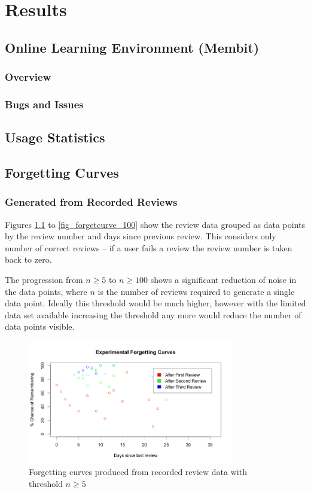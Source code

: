 \chapter{Results}

\section{Online Learning Environment (Membit)}
\subsection{Overview}
\subsection{Bugs and Issues}

\section{Usage Statistics}

\section{Forgetting Curves}
\subsection*{Generated from Recorded Reviews}

Figures \ref{fig_forgetcurve_5} to \ref{fig_forgetcurve_100} show the review data grouped
as data points by the review number and days since previous review. This considers only
number of correct reviews -- if a user fails a review the review number is taken back
to zero.

The progression from $n \geq 5$ to $n \geq 100$ shows a significant reduction of noise
in the data points, where $n$ is the number of reviews required to generate a single data
point. Ideally this threshold would be much higher, however with the limited data set
available increasing the threshold any more would reduce the number of data points
visible.

\begin{figure}[h!]
\includegraphics[width=9cm]{img/forgetcurve_5.png}
\caption{Forgetting curves produced from recorded review data with threshold $n \geq 5$}
\label{fig_forgetcurve_5}
\end{figure}

